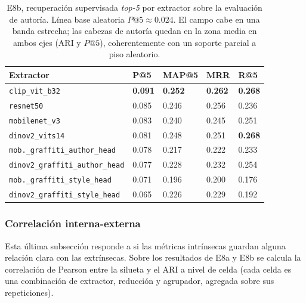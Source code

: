 \begin{table}[h]
  \centering
{\footnotesize
\begin{tabular}{|p{5.4cm}|p{1.2cm}|p{1.6cm}|p{1.2cm}|p{1.2cm}|} \hline
  \textbf{Extractor} & \textbf{P@5} & \textbf{MAP@5} & \textbf{MRR} & \textbf{R@5} \\ \hline
  \texttt{clip\_vit\_b32}                    & \textbf{0.091} & \textbf{0.252} & \textbf{0.262} & \textbf{0.268} \\ \hline
  \texttt{resnet50}                          & 0.085 & 0.246 & 0.256 & 0.236 \\ \hline
  \texttt{mobilenet\_v3}                     & 0.083 & 0.240 & 0.245 & 0.251 \\ \hline
  \texttt{dinov2\_vits14}                    & 0.081 & 0.248 & 0.251 & \textbf{0.268} \\ \hline
  \texttt{mob.\_graffiti\_author\_head}      & 0.078 & 0.217 & 0.222 & 0.233 \\ \hline
  \texttt{dinov2\_graffiti\_author\_head}    & 0.077 & 0.228 & 0.232 & 0.254 \\ \hline
  \texttt{mob.\_graffiti\_style\_head}       & 0.071 & 0.196 & 0.200 & 0.176 \\ \hline
  \texttt{dinov2\_graffiti\_style\_head}     & 0.065 & 0.226 & 0.229 & 0.192 \\ \hline
\end{tabular}
}
  \caption[E8b, recuperación supervisada \textit{top-5} (autoría)]{E8b, recuperación supervisada \textit{top-5} por extractor sobre
  la evaluación de autoría. Línea base aleatoria $P@5 \approx 0.024$. El
  campo cabe en una banda estrecha; las cabezas de autoría quedan en la
  zona media en ambos ejes (ARI y $P@5$), coherentemente con un soporte
  parcial a piso aleatorio.}
  \label{tab:e8b-retrieval}
\end{table}

\subsubsection{Correlación interna-externa}
\label{subsubsec:res-correlacion}
Esta última subsección responde a si las métricas intrínsecas guardan alguna
relación clara con las extrínsecas. Sobre los resultados de E8a y E8b se calcula
la correlación de Pearson entre la silueta y el ARI a nivel de celda (cada celda
es una combinación de extractor, reducción y agrupador, agregada sobre sus
repeticiones).

